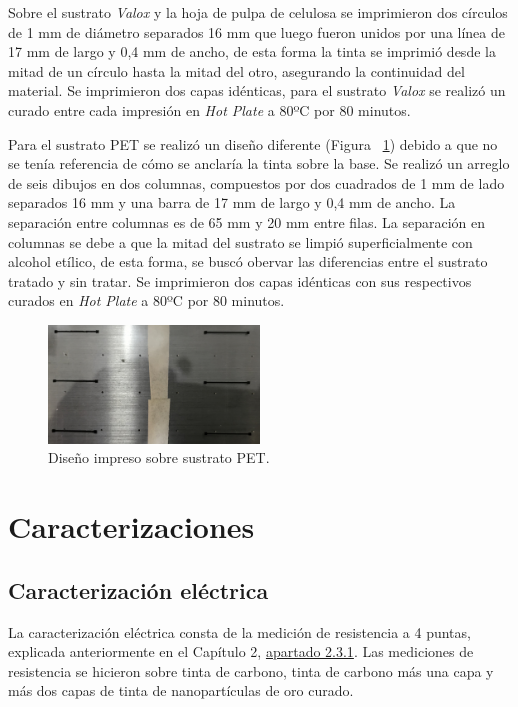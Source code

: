 Sobre el sustrato \textit{Valox} y la hoja de pulpa de celulosa se imprimieron dos círculos de 1 mm de diámetro separados 16 mm que luego fueron unidos por una línea de 17 mm de largo y 0,4 mm de ancho, de esta forma la tinta se imprimió desde la mitad de un círculo hasta la mitad del otro, asegurando la continuidad del material. Se imprimieron dos capas idénticas, para el sustrato \textit{Valox} se realizó un curado entre cada impresión en \textit{Hot Plate} a 80ºC por 80 minutos.

Para el sustrato PET se realizó un diseño diferente (Figura ~\ref{fig:Figura_impresion_sobre_PET}) debido a que no se tenía referencia de cómo se anclaría la tinta sobre la base. Se realizó un arreglo de seis dibujos en dos columnas, compuestos por dos cuadrados de 1 mm de lado separados 16 mm y una barra de 17 mm de largo y 0,4 mm de ancho. La separación entre columnas es de 65 mm y 20 mm entre filas. La separación en columnas se debe a que la mitad del sustrato se limpió superficialmente con alcohol etílico, de esta forma, se buscó obervar las diferencias entre el sustrato tratado y sin tratar. Se imprimieron dos capas idénticas con sus respectivos curados en \textit{Hot Plate} a 80ºC por 80 minutos.

\begin{figure}[H]
  \centering
    \includegraphics[width=0.5\textwidth]{Figuras/Figura_impresion_sobre_PET}
  \caption{Diseño impreso sobre sustrato PET.}
  \label{fig:Figura_impresion_sobre_PET}
\end{figure}

\section{Caracterizaciones}
\subsection{Caracterización eléctrica}
La caracterización eléctrica consta de la medición de resistencia a 4 puntas, explicada anteriormente en el Capítulo 2, \hyperref[subsec:carac_elec]{apartado 2.3.1}. Las mediciones de resistencia se hicieron sobre tinta de carbono, tinta de carbono más una capa y más dos capas de tinta de nanopartículas de oro curado.

